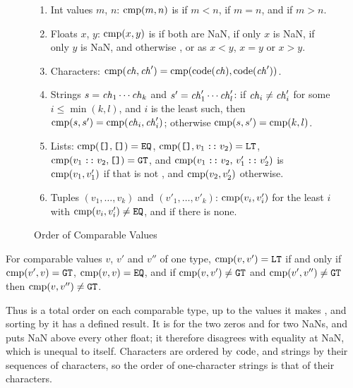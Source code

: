 \begin{figure}[htbp]
\centering
\small
\begin{enumerate}
\item Int values $m$, $n$: $\mathrm{cmp}(m,n)$ is  if $m<n$,  if
  $m=n$, and  if $m>n$.
\item Floats $x$, $y$: $\mathrm{cmp}(x,y)$ is  if both are NaN,  if only $x$ is
  NaN,  if only $y$ is NaN, and otherwise ,  or 
  as $x<y$, $x=y$ or $x>y$.
\item Characters: $\mathrm{cmp}(\mathit{ch},\mathit{ch}')=\mathrm{cmp}(\mathrm{code}(\mathit{ch}),\mathrm{code}(\mathit{ch}'))$.
\item Strings $s=\mathit{ch}_1\cdots\mathit{ch}_k$ and $s'=\mathit{ch}'_1\cdots\mathit{ch}'_l$: if
  $\mathit{ch}_i\neq\mathit{ch}'_i$ for some $i\leq\min(k,l)$, and $i$ is the least such,
  then $\mathrm{cmp}(s,s')=\mathrm{cmp}(\mathit{ch}_i,\mathit{ch}'_i)$; otherwise
  $\mathrm{cmp}(s,s')=\mathrm{cmp}(k,l)$.
\item Lists: $\mathrm{cmp}(\textnormal{\texttt{[]}},\textnormal{\texttt{[]}})=\textnormal{\texttt{EQ}}$,
  $\mathrm{cmp}(\textnormal{\texttt{[]}},v_1\mathbin{\textnormal{\texttt{::}}}v_2)=\textnormal{\texttt{LT}}$,
  $\mathrm{cmp}(v_1\mathbin{\textnormal{\texttt{::}}}v_2,\textnormal{\texttt{[]}})=\textnormal{\texttt{GT}}$, and
  $\mathrm{cmp}(v_1\mathbin{\textnormal{\texttt{::}}}v_2,\,v'_1\mathbin{\textnormal{\texttt{::}}}v'_2)$ is
  $\mathrm{cmp}(v_1,v'_1)$ if that is not , and $\mathrm{cmp}(v_2,v'_2)$ otherwise.
\item Tuples $(v_1,\ldots,v_k)$ and $(v'_1,\ldots,v'_k)$: $\mathrm{cmp}(v_i,v'_i)$
  for the least $i$ with $\mathrm{cmp}(v_i,v'_i)\neq\textnormal{\texttt{EQ}}$, and  if there is
  none.
\end{enumerate}
\caption{Order of Comparable Values}\label{fig:dynamic-basis-order}
\end{figure}

\begin{property}
For comparable values $v$, $v'$ and $v''$ of one type,
$\mathrm{cmp}(v,v')=\textnormal{\texttt{LT}}$ if and only if $\mathrm{cmp}(v',v)=\textnormal{\texttt{GT}}$,
$\mathrm{cmp}(v,v)=\textnormal{\texttt{EQ}}$, and if $\mathrm{cmp}(v,v')\neq\textnormal{\texttt{GT}}$ and
$\mathrm{cmp}(v',v'')\neq\textnormal{\texttt{GT}}$ then $\mathrm{cmp}(v,v'')\neq\textnormal{\texttt{GT}}$.
\end{property}
Thus  is a total order on each comparable type, up to the values
it makes , and sorting by it has a defined result. It is
 for the two zeros and for two NaNs, and puts NaN above every other
float; it therefore disagrees with equality at NaN, which is unequal to
itself. %
Characters are ordered by $\mathrm{code}$, and strings by their sequences of
characters, so the order of one-character strings is that of their
characters. %

